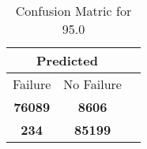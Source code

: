 \begin{table}[] 
\caption{Confusion Matric for 95.0} 
\label{Table: Prediction Accuracy-DMD95.0OnlySunEKF-ignoreReflection20.9EKF-top2-Reflection} 
\centering 
\begin{tabular} 
 {@{}ccc@{}} 
\toprule 
\multicolumn{2}{c}{\textbf{Predicted}}
 \\ \midrule 
\multicolumn{1}{|c|}{Failure} & 
\multicolumn{1}{c|}{No Failure}
 \\ \midrule 
\multicolumn{1}{|c|}{\color{green}\textbf{76089}} & 
\multicolumn{1}{c|}{\color{red}\textbf{8606}}
 \\ \midrule 
\multicolumn{1}{|c|}{\color{red}\textbf{234}} & 
\multicolumn{1}{c|}{\color{green}\textbf{85199}}
 \\ \bottomrule 
\end{tabular} 
\end{table} 

